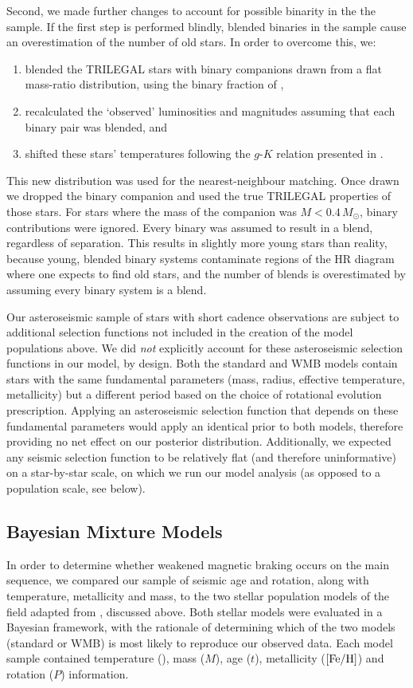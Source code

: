 Second, we made further changes to account for possible binarity in the the \cite{berger+2020} sample. If the first step is performed blindly, blended binaries in the sample cause an overestimation of the number of old stars. In order to overcome this, we:

\begin{enumerate}
	\item blended the TRILEGAL stars with binary companions drawn from a flat mass-ratio distribution, using the binary fraction of \cite{raghavan+2010},
	\item recalculated the `observed' luminosities and magnitudes assuming that each binary pair was blended, and
	\item shifted these stars' temperatures following the $g$-$K$ relation presented in \cite{berger+2020}.
\end{enumerate}

This new distribution was used for the nearest-neighbour matching. Once drawn we dropped the binary companion and used the true TRILEGAL properties of those stars. For stars where the mass of the companion was $M < 0.4\, M_\odot$, binary contributions were ignored. Every binary was assumed to result in a blend, regardless of separation. This results in slightly more young stars than reality, because young, blended binary systems contaminate regions of the HR diagram where one expects to find old stars, and the number of blends is overestimated by assuming every binary system is a blend.

Our asteroseismic sample of stars with short cadence observations are subject to additional selection functions not included in the creation of the model populations above. We did \textit{not} explicitly account for these asteroseismic selection functions in our model, by design. Both the standard and WMB models contain stars with the same fundamental parameters (mass, radius, effective temperature, metallicity) but a different period based on the choice of rotational evolution prescription. Applying an asteroseismic selection function that depends on these fundamental parameters \cite{chaplin+2011} would apply an identical prior to both models, therefore providing no net effect on our posterior distribution. Additionally, we expected any seismic selection function to be relatively flat (and therefore uninformative) on a star-by-star scale, on which we run our model analysis (as opposed to a population scale, see below).

\subsection{Bayesian Mixture Models}
In order to determine whether weakened magnetic braking occurs on the main sequence, we compared our sample of seismic age and rotation, along with temperature, metallicity and mass, to the two stellar population models of the \kepler field adapted from \cite{vansaders+2019}, discussed above. Both stellar models were evaluated in a Bayesian framework, with the rationale of determining which of the two models (standard or WMB) is most likely to reproduce our observed data. Each model sample contained temperature (\teff), mass ($M$), age ($t$), metallicity ($\rm{[Fe/H]}$) and rotation ($P$) information.

